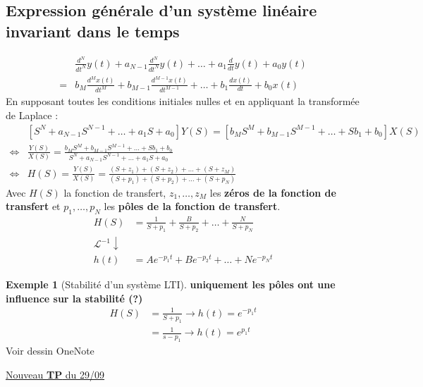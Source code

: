 \documentclass{article}
\theoremstyle{plain}%
\theoremstyle{definition}
\newtheorem{exmp}{Exemple}[section]
\theoremstyle{remark}
\begin{document}
\subsection{Expression générale d'un système linéaire invariant dans le temps}
\begin{align*}
    &\frac{d^N}{dt^N} y(t) + a_{N-1}\frac{d^N}{dt^N} y(t) + \dots + a_1 \frac{d}{dt}y(t) + a_0 y(t) \\
    =& b_M \frac{d^M x(t)}{dt^M} + b_{M-1} \frac{d^{M-1} x(t)}{dt^{M-1}} + \dots + b_1 \frac{d x(t)}{dt} + b_0 x(t)
\end{align*}
En supposant toutes les conditions initiales nulles et en appliquant la transformée de Laplace : 
\begin{align*}
    & [S^N + a_{N-1} S^{N-1} + \dots + a_1 S + a_0]Y(S) = [b_M S^M + b_{M-1} S^{M-1} + \dots + S b_1 + b_0] X(S) \\
    \Leftrightarrow & \frac{Y(S)}{X(S)} = \frac{b_M S^M + b_{M-1} S^{M-1} + \dots + S b_1 + b_0}{S^N + a_{N-1} S^{N-1} + \dots + a_1 S + a_0} \\ 
    \Leftrightarrow & H(S) = \frac{Y(S)}{X(S)} = \frac{(S + z_1) + (S + z_2) + \dots + (S + z_M)}{(S + p_1) + (S + p_2) + \dots + (S + p_N)}
\end{align*}
Avec $ H(S) $ la fonction de transfert, $ z_1, \dots, z_M $  les \textbf{zéros de la fonction de transfert} et $ p_1, \dots, p_N $ les \textbf{pôles de la fonction de transfert}.
\begin{align*}
    H(S) &= \frac{1}{S+p_1} + \frac{B}{S+p_2} + \dots + \frac{N}{S + p_N} \\
    \mathcal{L}^{-1} \downarrow & \\
    h(t) &= Ae^{-p_1t} + Be^{-p_2t} + \dots + Ne^{-p_Nt}
\end{align*}

\begin{exmp}[Stabilité d'un système LTI]
    \textbf{uniquement les pôles ont une influence sur la stabilité (?)}
    \begin{align*}
        H(S) &= \frac{1}{S+p_1} \rightarrow h(t) = e^{-p_1t} \\
            &= \frac{1}{s-p_1} \to h(t) = e^{p_1t}
    \end{align*}
    Voir dessin OneNote
\end{exmp}

\underline{Nouveau \textbf{TP} du 29/09} \\
\end{document}
